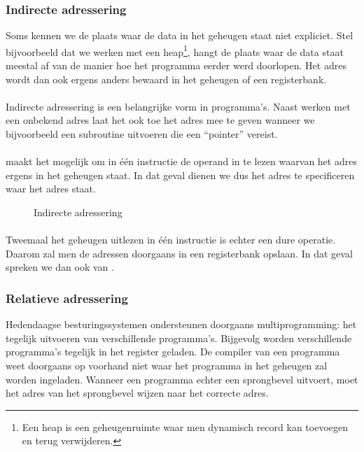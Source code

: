 \subsubsection{Indirecte adressering}
Soms kennen we de plaats waar de data in het geheugen staat niet expliciet. Stel bijvoorbeeld dat we werken met een heap\footnote{Een heap is een geheugenruimte waar men dynamisch record kan toevoegen en terug verwijderen.}, hangt de plaats waar de data staat meestal af van de manier hoe het programma eerder werd doorlopen. Het adres wordt dan ook ergens anders bewaard in het geheugen of een registerbank.
\paragraph{}
Indirecte adressering is een belangrijke vorm in programma's. Naast werken met een onbekend adres laat het ook toe het adres mee te geven wanneer we bijvoorbeeld een subroutine uitvoeren die een ``pointer'' vereist.
\paragraph{}
 maakt het mogelijk om in \'e\'en instructie de operand in te lezen waarvan het adres ergens in het geheugen staat. In dat geval dienen we dus het adres te specificeren waar het adres staat.
\begin{figure}[hbt]
\centering
{}
\caption{Indirecte adressering}
\end{figure}
\paragraph{}
Tweemaal het geheugen uitlezen in \'e\'en instructie is echter een dure operatie. Daarom zal men de adressen doorgaans in een registerbank opslaan. In dat geval spreken we dan ook van .
\subsubsection{Relatieve adressering}
Hedendaagse besturingssystemen ondersteunen doorgaans multiprogramming: het tegelijk uitvoeren van verschillende programma's. Bijgevolg worden verschillende programma's tegelijk in het register geladen. De compiler van een programma weet doorgaans op voorhand niet waar het programma in het geheugen zal worden ingeladen. Wanneer een programma echter een sprongbevel uitvoert, moet het adres van het sprongbevel wijzen naar het correcte adres.

